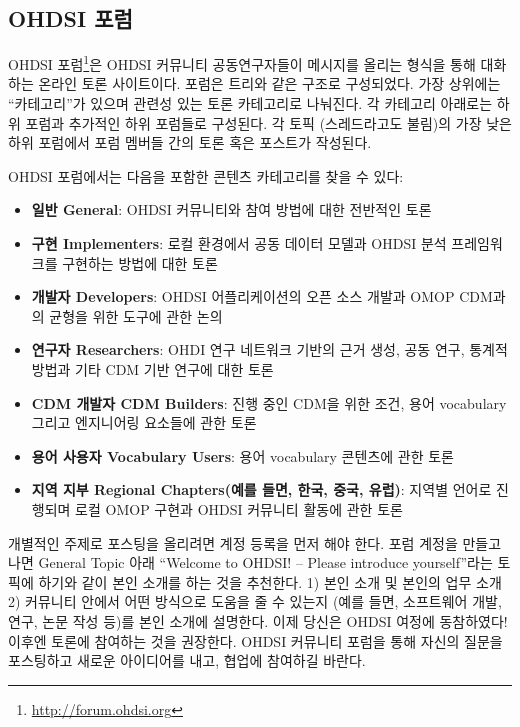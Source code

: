 \documentclass[10.5pt]{book}
\providecommand{\tightlist}{%
  \setlength{\itemsep}{0pt}\setlength{\parskip}{0pt}}
\let\rmarkdownfootnote\footnote%
\def\footnote{\protect\rmarkdownfootnote}
\theoremstyle{definition}
\theoremstyle{definition}
\theoremstyle{definition}
\theoremstyle{remark}
\begin{document}
\hypertarget{ohdsi-}{\subsection{OHDSI 포럼}\label{ohdsi-}}

OHDSI 포럼\footnote{\url{http://forum.ohdsi.org}}은 OHDSI 커뮤니티
공동연구자들이 메시지를 올리는 형식을 통해 대화하는 온라인 토론
사이트이다. 포럼은 트리와 같은 구조로 구성되었다. 가장 상위에는
``카테고리''가 있으며 관련성 있는 토론 카테고리로 나눠진다. 각 카테고리
아래로는 하위 포럼과 추가적인 하위 포럼들로 구성된다. 각 토픽
(스레드라고도 불림)의 가장 낮은 하위 포럼에서 포럼 멤버들 간의 토론 혹은
포스트가 작성된다.

OHDSI 포럼에서는 다음을 포함한 콘텐츠 카테고리를 찾을 수 있다:

\begin{itemize}
\tightlist
\item
  \textbf{일반 General}: OHDSI 커뮤니티와 참여 방법에 대한 전반적인 토론
\item
  \textbf{구현 Implementers}: 로컬 환경에서 공동 데이터 모델과 OHDSI
  분석 프레임워크를 구현하는 방법에 대한 토론
\item
  \textbf{개발자 Developers}: OHDSI 어플리케이션의 오픈 소스 개발과 OMOP
  CDM과의 균형을 위한 도구에 관한 논의
\item
  \textbf{연구자 Researchers}: OHDI 연구 네트워크 기반의 근거 생성, 공동
  연구, 통계적 방법과 기타 CDM 기반 연구에 대한 토론
\item
  \textbf{CDM 개발자 CDM Builders}: 진행 중인 CDM을 위한 조건, 용어
  vocabulary 그리고 엔지니어링 요소들에 관한 토론
\item
  \textbf{용어 사용자 Vocabulary Users}: 용어 vocabulary 콘텐츠에 관한
  토론
\item
  \textbf{지역 지부 Regional Chapters(예를 들면, 한국, 중국, 유럽)}:
  지역별 언어로 진행되며 로컬 OMOP 구현과 OHDSI 커뮤니티 활동에 관한
  토론
\end{itemize}

개별적인 주제로 포스팅을 올리려면 계정 등록을 먼저 해야 한다. 포럼
계정을 만들고 나면 General Topic 아래 ``Welcome to OHDSI! -- Please
introduce yourself''라는 토픽에 하기와 같이 본인 소개를 하는 것을
추천한다. 1) 본인 소개 및 본인의 업무 소개 2) 커뮤니티 안에서 어떤
방식으로 도움을 줄 수 있는지 (예를 들면, 소프트웨어 개발, 연구, 논문
작성 등)를 본인 소개에 설명한다. 이제 당신은 OHDSI 여정에 동참하였다!
이후엔 토론에 참여하는 것을 권장한다. OHDSI 커뮤니티 포럼을 통해 자신의
질문을 포스팅하고 새로운 아이디어를 내고, 협업에 참여하길 바란다.
\end{document}

